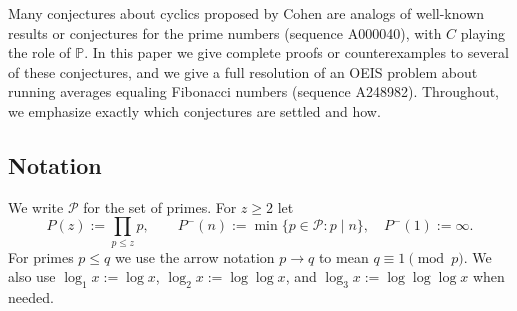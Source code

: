 \documentclass[12pt]{article}
\providecommand{\seqnum}[1]{#1}
\theoremstyle{remark}
\begin{document}
Many conjectures about cyclics proposed by Cohen \cite{Cohen2025} are analogs of well-known results or conjectures for the prime numbers (sequence \seqnum{A000040}), with $C$ playing the role of $\mathbb P$. In this paper we give complete proofs or counterexamples to several of these conjectures, and we give a full resolution of an OEIS problem about running averages equaling Fibonacci numbers (sequence \seqnum{A248982}). Throughout, we emphasize exactly which conjectures are settled and how.

\subsection*{Notation}
We write $\mathcal P$ for the set of primes. For $z\ge2$ let
\[
 P(z):=\prod_{p\le z}p,\qquad P^-(n):=\min\{p\in\mathcal P: p\mid n\},\quad P^-(1):=\infty.
\]
For primes $p\le q$ we use the arrow notation $p\to q$ to mean $q\equiv1\pmod p$. We also use $\log_1 x:=\log x$, $\log_2 x:=\log\log x$, and $\log_3 x:=\log\log\log x$ when needed.
\end{document}
